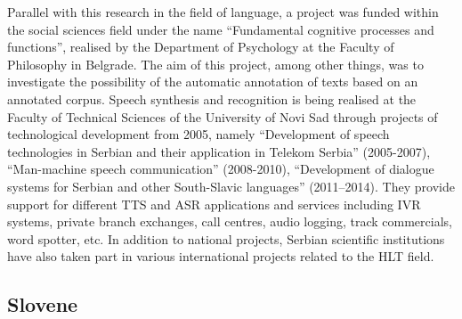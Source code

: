 \documentclass[10pt, plain]{../../metanetpaper}
\begin{document}
\begin{multicols}{2}
\begin{small}
Parallel with this research in the field of language, a project was funded within the social sciences field under the name “Fundamental cognitive processes and functions”, realised by the Department of Psychology at the Faculty of Philosophy in Belgrade. The aim of this project, among other things, was to investigate the possibility of the automatic annotation of texts based on an annotated corpus.  Speech synthesis and recognition is being realised at the Faculty of Technical Sciences of the University of Novi Sad through projects of technological development from 2005, namely “Development of speech technologies in Serbian and their application in Telekom Serbia” (2005-2007), “Man-machine speech communication” (2008-2010), “Development of dialogue systems for Serbian and other South-Slavic languages” (2011–2014). They provide support for different TTS and ASR applications and services including IVR systems, private branch exchanges, call centres, audio logging, track commercials, word spotter, etc.  In addition to national projects, Serbian scientific institutions have also taken part in various international projects related to the HLT field.

%

\subsection*{Slovene}
\label{sec:slovene}


\end{small}
\end{multicols}
\end{document}

